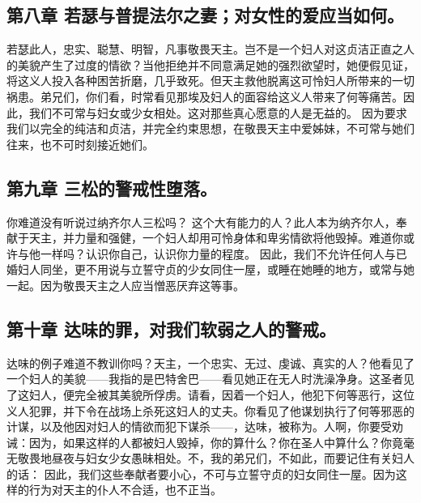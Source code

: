 
\subsection{第八章 若瑟与普提法尔之妻；对女性的爱应当如何。}

若瑟此人，忠实、聪慧、明智，凡事敬畏天主。岂不是一个妇人对这贞洁正直之人的美貌产生了过度的情欲？当他拒绝并不同意满足她的强烈欲望时，她便假见证，将这义人投入各种困苦折磨，几乎致死。但天主救他脱离这可怜妇人所带来的一切祸患。弟兄们，你们看，时常看见那埃及妇人的面容给这义人带来了何等痛苦。因此，我们不可常与妇女或少女相处。这对那些真心愿意的人是无益的。 因为要求我们以完全的纯洁和贞洁，并完全约束思想，在敬畏天主中爱姊妹，不可常与她们往来，也不可时刻接近她们。\par


\subsection{第九章 三松的警戒性堕落。}

你难道没有听说过纳齐尔人三松吗？  这个大有能力的人？此人本为纳齐尔人，奉献于天主，并力量和强健，一个妇人却用可怜身体和卑劣情欲将他毁掉。难道你或许与他一样吗？认识你自己，认识你力量的程度。  因此，我们不允许任何人与已婚妇人同坐，更不用说与立誓守贞的少女同住一屋，或睡在她睡的地方，或常与她一起。因为敬畏天主之人应当憎恶厌弃这等事。\par


\subsection{第十章 达味的罪，对我们软弱之人的警戒。}

达味的例子难道不教训你吗？天主，一个忠实、无过、虔诚、真实的人？他看见了一个妇人的美貌——我指的是巴特舍巴——看见她正在无人时洗澡净身。这圣者见了这妇人，便完全被其美貌所俘虏。请看，因着一个妇人，他犯下何等恶行，这位义人犯罪，并下令在战场上杀死这妇人的丈夫。你看见了他谋划执行了何等邪恶的计谋，以及他因对妇人的情欲而犯下谋杀——，达味，被称为。人啊，你要受劝诫：因为，如果这样的人都被妇人毁掉，你的算什么？你在圣人中算什么？你竟毫无敬畏地昼夜与妇女少女愚昧相处。不，我的弟兄们，不如此，而要记住有关妇人的话：  因此，我们这些奉献者要小心，不可与立誓守贞的妇女同住一屋。因为这样的行为对天主的仆人不合适，也不正当。\par

